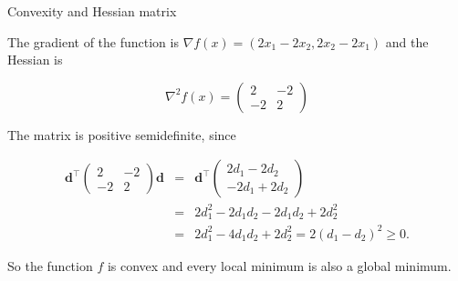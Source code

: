 \begin{vbframe}{Convexity and Hessian matrix}


The gradient of the function is $\nabla f(x) = (2x_1 - 2x_2, 2x_2 - 2x_1)$ and the Hessian is

$$
\nabla^2 f(x) = \begin{pmatrix} 2 & -2 \\ -2 & 2 \end{pmatrix}
$$

\lz

The matrix is positive semidefinite, since

\begin{eqnarray*}
\mathbf{d}^{\top}\begin{pmatrix} 2 & -2 \\ -2 & 2 \end{pmatrix}\mathbf{d} &=& \mathbf{d}^{\top} \begin{pmatrix} 2d_1 - 2d_2 \\ -2d_1 + 2d_2\end{pmatrix} \\ &=& 2d_1^2 - 2d_1d_2 -2d_1d_2 + 2d_2^2 \\ &=& 2d_1^2 - 4d_1d_2 + 2d_2^2 = 2 (d_1 - d_2)^2 \ge 0.
\end{eqnarray*}

So the function $f$ is convex and every local minimum is also a global minimum.

\end{vbframe}



